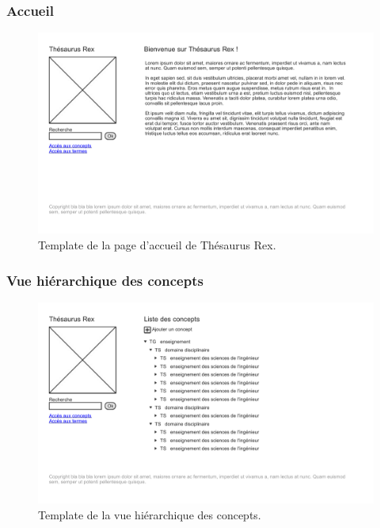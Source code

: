 \subsubsection{Accueil}
\begin{figure}[H]
\begin{center}
\includegraphics[width=\textwidth]{files/template_accueil}
\end{center}
\caption{Template de la page d'accueil de Thésaurus Rex.}
\end{figure}

\subsubsection{Vue hiérarchique des concepts}
\begin{figure}[H]
\begin{center}
\includegraphics[width=\textwidth]{files/template_concepts}
\end{center}
\caption{Template de la vue hiérarchique des concepts.}
\end{figure}

